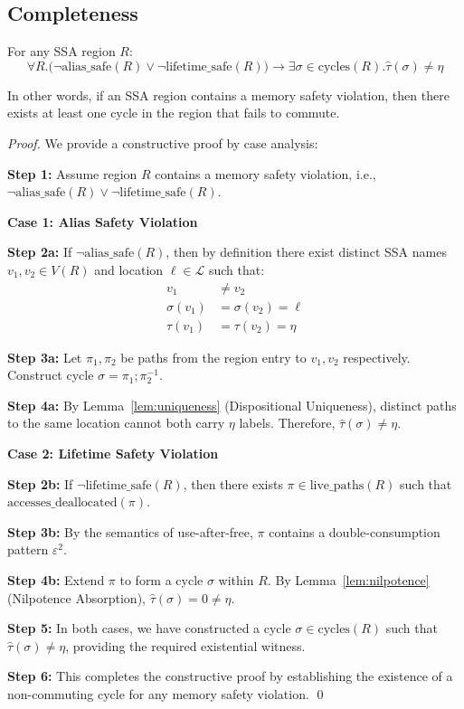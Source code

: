 \documentclass[journal]{IEEEtran}
\begin{document}
\subsection{Completeness}

\begin{theorem}[Completeness]
For any SSA region $R$:
$$\forall R. \big( \neg \text{alias\_safe}(R) \lor \neg \text{lifetime\_safe}(R) \big) \rightarrow \exists \sigma \in \text{cycles}(R). \hat{\tau}(\sigma) \neq \eta$$

In other words, if an SSA region contains a memory safety violation, then there exists at least one cycle in the region that fails to commute.
\end{theorem}

\begin{proof}
We provide a constructive proof by case analysis:

\textbf{Step 1:} Assume region $R$ contains a memory safety violation, i.e., $\neg \text{alias\_safe}(R) \lor \neg \text{lifetime\_safe}(R)$.

\textbf{Case 1: Alias Safety Violation}

\textbf{Step 2a:} If $\neg \text{alias\_safe}(R)$, then by definition there exist distinct SSA names $v_1, v_2 \in V(R)$ and location $\ell \in \mathcal{L}$ such that:
\begin{align}
v_1 &\neq v_2 \\
\sigma(v_1) &= \sigma(v_2) = \ell \\
\tau(v_1) &= \tau(v_2) = \eta
\end{align}

\textbf{Step 3a:} Let $\pi_1, \pi_2$ be paths from the region entry to $v_1, v_2$ respectively. Construct cycle $\sigma = \pi_1 ; \pi_2^{-1}$.

\textbf{Step 4a:} By Lemma~\ref{lem:uniqueness} (Dispositional Uniqueness), distinct paths to the same location cannot both carry $\eta$ labels. Therefore, $\hat{\tau}(\sigma) \neq \eta$.

\textbf{Case 2: Lifetime Safety Violation}

\textbf{Step 2b:} If $\neg \text{lifetime\_safe}(R)$, then there exists $\pi \in \text{live\_paths}(R)$ such that $\text{accesses\_deallocated}(\pi)$.

\textbf{Step 3b:} By the semantics of use-after-free, $\pi$ contains a double-consumption pattern $\varepsilon^2$.

\textbf{Step 4b:} Extend $\pi$ to form a cycle $\sigma$ within $R$. By Lemma~\ref{lem:nilpotence} (Nilpotence Absorption), $\hat{\tau}(\sigma) = 0 \neq \eta$.

\textbf{Step 5:} In both cases, we have constructed a cycle $\sigma \in \text{cycles}(R)$ such that $\hat{\tau}(\sigma) \neq \eta$, providing the required existential witness.

\textbf{Step 6:} This completes the constructive proof by establishing the existence of a non-commuting cycle for any memory safety violation. \qed
\end{proof}
\end{document}

